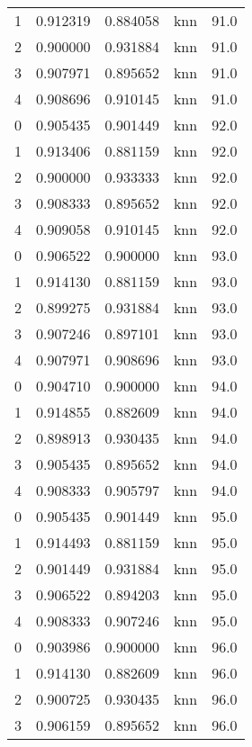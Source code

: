 \begin{tabular}{rrrlr}
     1 & 0.912319 & 0.884058 &      knn &       91.0 \\
     2 & 0.900000 & 0.931884 &      knn &       91.0 \\
     3 & 0.907971 & 0.895652 &      knn &       91.0 \\
     4 & 0.908696 & 0.910145 &      knn &       91.0 \\
     0 & 0.905435 & 0.901449 &      knn &       92.0 \\
     1 & 0.913406 & 0.881159 &      knn &       92.0 \\
     2 & 0.900000 & 0.933333 &      knn &       92.0 \\
     3 & 0.908333 & 0.895652 &      knn &       92.0 \\
     4 & 0.909058 & 0.910145 &      knn &       92.0 \\
     0 & 0.906522 & 0.900000 &      knn &       93.0 \\
     1 & 0.914130 & 0.881159 &      knn &       93.0 \\
     2 & 0.899275 & 0.931884 &      knn &       93.0 \\
     3 & 0.907246 & 0.897101 &      knn &       93.0 \\
     4 & 0.907971 & 0.908696 &      knn &       93.0 \\
     0 & 0.904710 & 0.900000 &      knn &       94.0 \\
     1 & 0.914855 & 0.882609 &      knn &       94.0 \\
     2 & 0.898913 & 0.930435 &      knn &       94.0 \\
     3 & 0.905435 & 0.895652 &      knn &       94.0 \\
     4 & 0.908333 & 0.905797 &      knn &       94.0 \\
     0 & 0.905435 & 0.901449 &      knn &       95.0 \\
     1 & 0.914493 & 0.881159 &      knn &       95.0 \\
     2 & 0.901449 & 0.931884 &      knn &       95.0 \\
     3 & 0.906522 & 0.894203 &      knn &       95.0 \\
     4 & 0.908333 & 0.907246 &      knn &       95.0 \\
     0 & 0.903986 & 0.900000 &      knn &       96.0 \\
     1 & 0.914130 & 0.882609 &      knn &       96.0 \\
     2 & 0.900725 & 0.930435 &      knn &       96.0 \\
     3 & 0.906159 & 0.895652 &      knn &       96.0 \\

\end{tabular}
